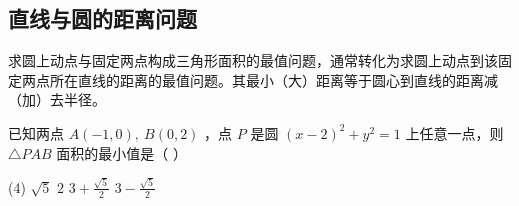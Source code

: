 \vspace{4em}

\subsection{直线与圆的距离问题}

\begin{theorem}[点到直线的距离与圆的几何性质]
    求圆上动点与固定两点构成三角形面积的最值问题，通常转化为求圆上动点到该固定两点所在直线的距离的最值问题。其最小（大）距离等于圆心到直线的距离减（加）去半径。
\end{theorem}
\begin{example}
    已知两点 $A(-1,0), ~ B(0,2)$ ，点 $P$ 是圆 $(x-2)^2+y^2=1$ 上任意一点，则 $\triangle P A B$ 面积的最小值是（ \hspace{2em} ）
    \begin{tasks}(4)
        \task $\sqrt{5}$
        \task $2$
        \task $3+\frac{\sqrt{5}}{2}$
        \task $3-\frac{\sqrt{5}}{2}$
    \end{tasks}
\end{example}

